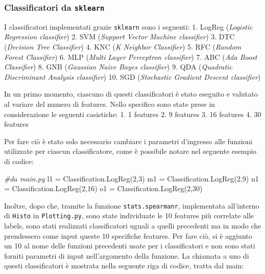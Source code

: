 \documentclass[11pt]{article}
\newenvironment{Shaded}{}{}
\newcommand{\DecValTok}[1]{\textcolor[rgb]{0.25,0.63,0.44}{{#1}}}
\newcommand{\CommentTok}[1]{\textcolor[rgb]{0.38,0.63,0.69}{\textit{{#1}}}}
\newcommand{\NormalTok}[1]{{#1}}
\newcommand{\OperatorTok}[1]{\textcolor[rgb]{0.40,0.40,0.40}{{#1}}}
\begin{document}
    \subsubsection{\texorpdfstring{Classificatori da
\texttt{sklearn}}{Classificatori da sklearn}}\label{classificatori-da-sklearn}

    I classificatori implementati grazie \texttt{sklearn} sono i seguenti:
1. LogReg (\emph{Logistic Regression classifier}) 2. SVM (\emph{Support
Vector Machine classifier}) 3. DTC (\emph{Decision Tree Classifier}) 4.
KNC (\emph{K Neighbor Classifier}) 5. RFC (\emph{Random Forest
Classifier}) 6. MLP (\emph{Multi Layer Perceptron classifier}) 7. ABC
(\emph{Ada Boost Classifier}) 8. GNB (\emph{Gaussian Naive Bayes
classifier}) 9. QDA (\emph{Quadratic Discriminant Analysis classifier})
10. SGD (\emph{Stochastic Gradient Descent classifier})

In un primo momento, ciascuno di questi classificatori è stato eseguito
e valutato al variare del numero di features. Nello specifico sono state
prese in considerazione le seguenti casistiche: 1. 1 features 2. 9
features 3. 16 features 4. 30 features

Per fare ciò è stato solo necessario cambiare i parametri d'ingresso
alle funzioni utilizzate per ciascun classificatore, come è possibile
notare nel seguente esempio di codice:

\begin{Shaded}
\begin{Highlighting}[]
\CommentTok{#da main.py}
\NormalTok{l1 }\OperatorTok{=}\NormalTok{ Classification.LogReg(}\DecValTok{2}\NormalTok{,}\DecValTok{3}\NormalTok{)}
\NormalTok{m1 }\OperatorTok{=}\NormalTok{ Classification.LogReg(}\DecValTok{2}\NormalTok{,}\DecValTok{9}\NormalTok{)}
\NormalTok{n1 }\OperatorTok{=}\NormalTok{ Classification.LogReg(}\DecValTok{2}\NormalTok{,}\DecValTok{16}\NormalTok{)}
\NormalTok{o1 }\OperatorTok{=}\NormalTok{ Classification.LogReg(}\DecValTok{2}\NormalTok{,}\DecValTok{30}\NormalTok{)}
\end{Highlighting}
\end{Shaded}

Inoltre, dopo che, tramite la funzione \texttt{stats.spearmanr},
implementata all'interno di \texttt{Histo} in \texttt{Plotting.py}, sono
state individuate le 10 features più correlate alle labels, sono stati
realizzati classificatori uguali a quelli precedenti ma in modo che
prendessero come input queste 10 specifiche features. Per fare ciò, si è
aggiunto un 10 al nome delle funzioni precedenti usate per i
classificatori e non sono stati forniti parametri di input
nell'argomento della funzione. La chiamata a uno di questi
classificatori è mostrata nella seguente riga di codice, tratta dal
main:
\end{document}
